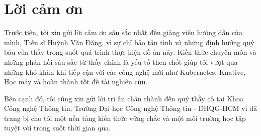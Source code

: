 \documentclass[12pt,a4paper]{article}
\begin{document}
\newpage

\section*{Lời cảm ơn}
Trước tiên, tôi xin gửi lời cảm ơn sâu sắc nhất đến giảng viên hướng dẫn của mình, Tiến sĩ Huỳnh Văn Đăng, vì sự chỉ bảo tận tình và những định hướng quý báu của thầy trong suốt quá trình thực hiện đồ án này. Kiến thức chuyên môn và những phản hồi sâu sắc từ thầy chính là yếu tố then chốt giúp tôi vượt qua những khó khăn khi tiếp cận với các công nghệ mới như Kubernetes, Knative, Học máy và hoàn thành tốt đề tài nghiên cứu.

Bên cạnh đó, tôi cũng xin gửi lời tri ân chân thành đến quý thầy cô tại Khoa Công nghệ Thông tin, Trường Đại học Công nghệ Thông tin - ĐHQG-HCM vì đã trang bị cho tôi một nền tảng kiến thức vững chắc và một môi trường học tập tuyệt vời trong suốt thời gian qua.

\newpage
\tableofcontents
\newpage
\listoffigures
\listoftables
\newpage







\nocite{*}



\appendix

\end{document}

